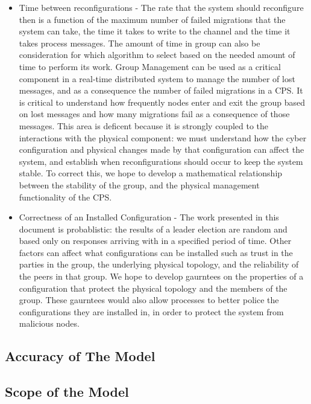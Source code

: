 \begin{itemize}
\item Time between reconfigurations - The rate that the system should reconfigure then is a function of the maximum number of failed migrations that the system can take, the time it takes to write to the channel and the time it takes process messages. The amount of time in group can also be consideration for which algorithm to select based on the needed amount of time to perform its work. Group Management can be used as a critical component in a real-time distributed system to manage the number of lost messages, and as a consequence the number of failed migrations in a CPS. It is critical to understand how frequently nodes enter and exit the group based on lost messages and how many migrations fail as a consequence of those messages. This area is deficent because it is strongly coupled to the interactions with the physical component: we must understand how the cyber configuration and physical changes made by that configuration can affect the system, and establish when reconfigurations should occur to keep the system stable. To correct this, we hope to develop a mathematical relationship between the stability of the group, and the physical management functionality of the CPS.

\item Correctness of an Installed Configuration - The work presented in this document is probablistic: the results of a leader election are random and based only on responses arriving with in a specified period of time. Other factors can affect what configurations can be installed such as trust in the parties in the group, the underlying physical topology, and the reliability of the peers in that group. We hope to develop gaurntees on the properties of a configuration that protect the physical topology and the members of the group. These gaurntees would also allow processes to better police the configurations they are installed in, in order to protect the system from malicious nodes.
\end{itemize}

\subsection{Accuracy of The Model}



\subsection{Scope of the Model}

